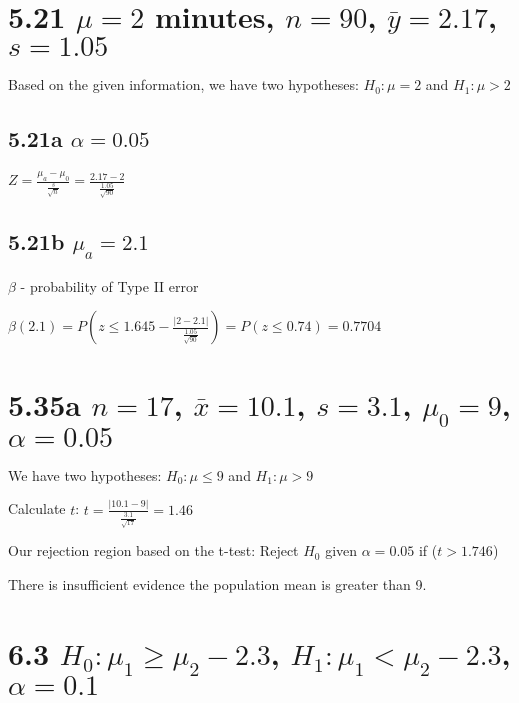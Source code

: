 \documentclass[16pt]{article}
\begin{document}
\section*{5.21 $\mu = 2$ minutes, $n = 90$, $\bar{y} = 2.17$, $s = 1.05$}
Based on the given information, we have two hypotheses: $H_{0}: \mu = 2$ and $H_{1}: \mu > 2$
\subsection*{5.21a $\alpha = 0.05$}
$Z = \frac{\mu_{a} - \mu_{0}}{\frac{s}{\sqrt{n}}} = \frac{2.17 - 2}{\frac{1.05}{\sqrt{90}}}$

\subsection*{5.21b $\mu_{a} = 2.1$}
$\beta$ - probability of Type II error \par\vspace{0.25cm}

\noindent $\beta(2.1) = P(z \leq 1.645 - \frac{|2 - 2.1|}{\frac{1.05}{\sqrt{90}}}) = P(z \leq 0.74) = 0.7704$

\section*{5.35a $n = 17$, $\bar{x} = 10.1$, $s = 3.1$, $\mu_{0} = 9$, $\alpha = 0.05$}

We have two hypotheses: $H_{0}: \mu \leq 9$ and $H_{1}: \mu > 9$ \par\noindent
Calculate $t$: $t = \frac{|10.1 - 9|}{\frac{3.1}{\sqrt{17}}} = 1.46$ \par
\noindent Our rejection region based on the t-test: Reject $H_{0}$ given $\alpha = 0.05$ if ($t > 1.746$) \par
\noindent There is insufficient evidence the population mean is greater than 9.

\section*{6.3 $H_{0}: \mu_{1} \geq \mu_{2} - 2.3$, $H_{1}: \mu_{1} < \mu_{2} - 2.3$, $\alpha = 0.1$}
\end{document}
